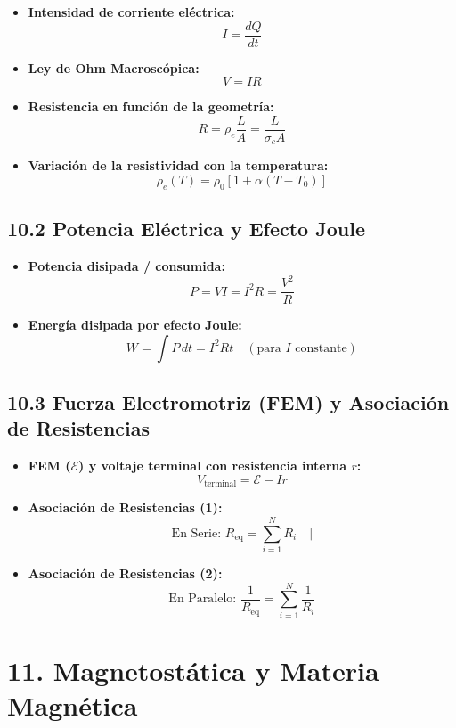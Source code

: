 \documentclass[11pt,a4paper]{article}
\begin{document}
\begin{itemize}
  \item \textbf{Intensidad de corriente eléctrica:}
  \[
    I = \frac{dQ}{dt}
  \]
  \item \textbf{Ley de Ohm Macroscópica:}
  \[
    V = I R
  \]
  \item \textbf{Resistencia en función de la geometría:}
  \[
    R = \rho_e \frac{L}{A} = \frac{L}{\sigma_c A}
  \]
  \item \textbf{Variación de la resistividad con la temperatura:}
  \[
    \rho_e(T) = \rho_0 [1 + \alpha (T - T_0)]
  \]
\end{itemize}

\subsection*{10.2 Potencia Eléctrica y Efecto Joule}

\begin{itemize}
  \item \textbf{Potencia disipada / consumida:}
  \[
    P = V I = I^2 R = \frac{V^2}{R}
  \]
  \item \textbf{Energía disipada por efecto Joule:}
  \[
    W = \int P \, dt = I^2 R t \quad (\text{para } I \text{ constante})
  \]
\end{itemize}

\subsection*{10.3 Fuerza Electromotriz (FEM) y Asociación de Resistencias}

\begin{itemize}
  \item \textbf{FEM ($\mathcal{E}$) y voltaje terminal con resistencia interna $r$:}
  \[
    V_{\text{terminal}} = \mathcal{E} - I r
  \]
  \item \textbf{Asociación de Resistencias (1):}
  \[
    \text{En Serie: } R_{\mathrm{eq}} = \sum_{i=1}^N R_i \quad |
  \]
  \item \textbf{Asociación de Resistencias (2):}
  \[
    \text{En Paralelo: } \frac{1}{R_{\mathrm{eq}}} = \sum_{i=1}^N \frac{1}{R_i}
  \]
\end{itemize}

\section*{11. Magnetostática y Materia Magnética}
\end{document}
